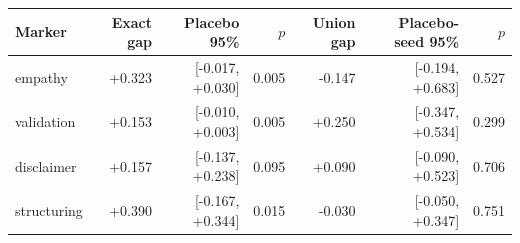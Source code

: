 \begin{tabular}{lrrrrrr}
\toprule
Marker & Exact gap & Placebo 95\% & $p$ & Union gap & Placebo-seed 95\% & $p$ \\
\midrule
empathy & +0.323 & [-0.017, +0.030] & 0.005 & -0.147 & [-0.194, +0.683] & 0.527 \\
validation & +0.153 & [-0.010, +0.003] & 0.005 & +0.250 & [-0.347, +0.534] & 0.299 \\
disclaimer & +0.157 & [-0.137, +0.238] & 0.095 & +0.090 & [-0.090, +0.523] & 0.706 \\
structuring & +0.390 & [-0.167, +0.344] & 0.015 & -0.030 & [-0.050, +0.347] & 0.751 \\
\bottomrule
\end{tabular}
